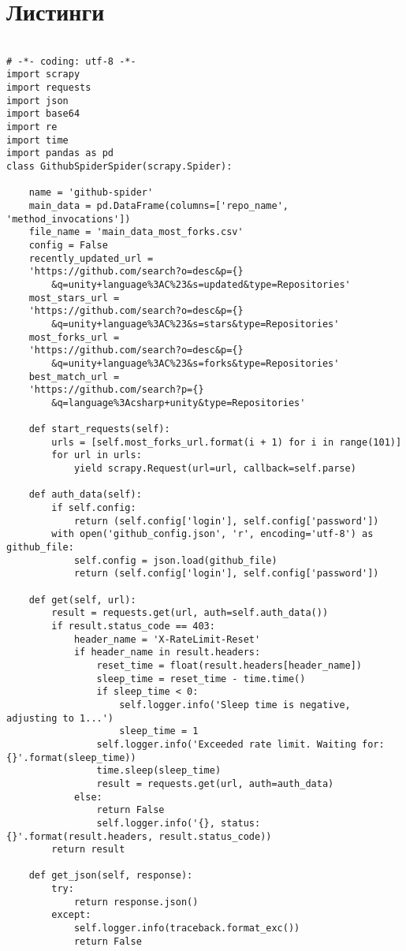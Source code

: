 \chapter{Листинги}

\begin{lstlisting}[caption={Исходный класса обработки веб-страниц проектов с сайта GitHub.com},label=spider]

# -*- coding: utf-8 -*-
import scrapy
import requests
import json
import base64
import re
import time
import pandas as pd
class GithubSpiderSpider(scrapy.Spider):

	name = 'github-spider'
	main_data = pd.DataFrame(columns=['repo_name', 'method_invocations'])
	file_name = 'main_data_most_forks.csv'
	config = False
	recently_updated_url = 
	'https://github.com/search?o=desc&p={}
		&q=unity+language%3AC%23&s=updated&type=Repositories'
	most_stars_url = 
	'https://github.com/search?o=desc&p={}
		&q=unity+language%3AC%23&s=stars&type=Repositories'
	most_forks_url = 
	'https://github.com/search?o=desc&p={}
		&q=unity+language%3AC%23&s=forks&type=Repositories'
	best_match_url = 
	'https://github.com/search?p={}
		&q=language%3Acsharp+unity&type=Repositories'

	def start_requests(self):
		urls = [self.most_forks_url.format(i + 1) for i in range(101)]
		for url in urls:
			yield scrapy.Request(url=url, callback=self.parse)
	
	def auth_data(self):
		if self.config:
			return (self.config['login'], self.config['password'])
		with open('github_config.json', 'r', encoding='utf-8') as github_file:
			self.config = json.load(github_file)
			return (self.config['login'], self.config['password'])
		
	def get(self, url):
		result = requests.get(url, auth=self.auth_data())
		if result.status_code == 403:
			header_name = 'X-RateLimit-Reset'
			if header_name in result.headers:
				reset_time = float(result.headers[header_name])
				sleep_time = reset_time - time.time()
				if sleep_time < 0:
					self.logger.info('Sleep time is negative, adjusting to 1...')
					sleep_time = 1
				self.logger.info('Exceeded rate limit. Waiting for: {}'.format(sleep_time))
				time.sleep(sleep_time)
				result = requests.get(url, auth=auth_data)
			else:
				return False
				self.logger.info('{}, status: {}'.format(result.headers, result.status_code))
		return result
	
	def get_json(self, response):
		try:
			return response.json()
		except:
			self.logger.info(traceback.format_exc())
			return False
	

\end{lstlisting}
